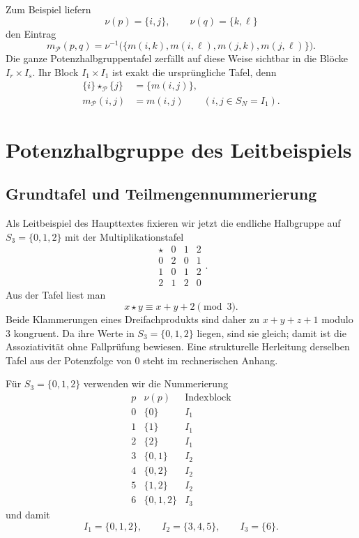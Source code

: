 \documentclass[main.tex]{subfiles}
\begin{document}
Zum Beispiel liefern
\[
  \nu(p)=\{i,j\},
  \qquad
  \nu(q)=\{k,\ell\}
\]
den Eintrag
\[
  m_{\mathcal P}(p,q)
  =
  \nu^{-1}\!\bigl(
    \{m(i,k),m(i,\ell),m(j,k),m(j,\ell)\}
  \bigr).
\]
Die ganze Potenzhalbgruppentafel zerfällt auf diese Weise sichtbar in die
Blöcke \(I_r\times I_s\).  Ihr Block \(I_1\times I_1\) ist exakt die
ursprüngliche Tafel, denn
\[
\begin{aligned}
  \{i\}\star_{\mathcal P}\{j\}&=\{m(i,j)\},\\
  m_{\mathcal P}(i,j)&=m(i,j)
    \qquad(i,j\in S_N=I_1).
\end{aligned}
\]


\section{Potenzhalbgruppe des Leitbeispiels}

\subsection{Grundtafel und Teilmengennummerierung}

Als Leitbeispiel des Haupttextes fixieren wir jetzt die endliche Halbgruppe
auf \(S_3=\{0,1,2\}\) mit der Multiplikationstafel
\[
\begin{array}{c|ccc}
\star&0&1&2\\\hline
0&2&0&1\\
1&0&1&2\\
2&1&2&0
\end{array}.
\]
Aus der Tafel liest man
\[
  x\star y\equiv x+y+2\pmod 3.
\]
Beide Klammerungen eines Dreifachprodukts sind daher zu
\(x+y+z+1\) modulo \(3\) kongruent.  Da ihre Werte in
\(S_3=\{0,1,2\}\) liegen, sind sie gleich; damit ist die Assoziativität ohne
Fallprüfung bewiesen.  Eine strukturelle Herleitung derselben Tafel aus der
Potenzfolge von \(0\) steht im rechnerischen Anhang.

Für \(S_3=\{0,1,2\}\) verwenden wir die Nummerierung
\[
\begin{array}{c|c|c}
p&\nu(p)&\text{Indexblock}\\\hline
0&\{0\}&I_1\\
1&\{1\}&I_1\\
2&\{2\}&I_1\\\hline
3&\{0,1\}&I_2\\
4&\{0,2\}&I_2\\
5&\{1,2\}&I_2\\\hline
6&\{0,1,2\}&I_3
\end{array}
\]
und damit
\[
  I_1=\{0,1,2\},
  \qquad
  I_2=\{3,4,5\},
  \qquad
  I_3=\{6\}.
\]
\end{document}
